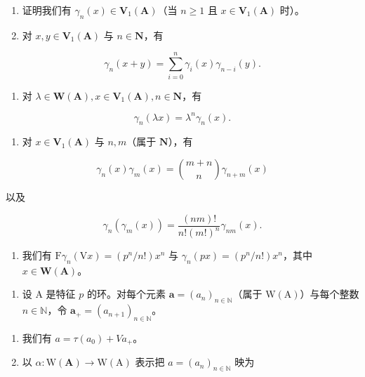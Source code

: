 \begin{enumerate}
\def\labelenumi{(\roman{enumi})}
\item
  证明我们有 \(\gamma_{n}(x)\in\mathbf{V}_{1}(\mathbf{A})\)（当 \(n\geqslant 1\) 且 \(x\in\mathbf{V}_{1}(\mathbf{A})\) 时）。
\item
  对 \(x, y \in \mathbf{V}_1(\mathbf{A})\) 与 \(n \in \mathbf{N}\)，有
\end{enumerate}

\[
\gamma_ {n} (x + y) = \sum_ {i = 0} ^ {n} \gamma_ {i} (x) \gamma_ {n - i} (y).
\]

\begin{enumerate}
\def\labelenumi{(\roman{enumi})}
\setcounter{enumi}{2}
\tightlist
\item
  对 \(\lambda \in \mathbf{W}(\mathbf{A}), x \in \mathbf{V}_1(\mathbf{A}), n \in \mathbf{N}\)，有
\end{enumerate}

\[
\gamma_ {n} (\lambda x) = \lambda^ {n} \gamma_ {n} (x).
\]

\begin{enumerate}
\def\labelenumi{(\roman{enumi})}
\setcounter{enumi}{3}
\tightlist
\item
  对 \(x \in \mathbf{V}_1(\mathbf{A})\) 与 \(n, m\)（属于 \(\mathbf{N}\)），有
\end{enumerate}

\[
\gamma_ {n} (x) \gamma_ {m} (x) = \binom {m + n} {n} \gamma_ {n + m} (x)
\]

以及

\[
\gamma_ {n} (\gamma_ {m} (x)) = \frac {(n m) !}{n ! (m !) ^ {n}} \gamma_ {n m} (x).
\]

\begin{enumerate}
\def\labelenumi{(\alph{enumi})}
\setcounter{enumi}{21}
\tightlist
\item
  我们有 \(\mathrm{F}\gamma_{n}(\mathrm{V}x) = (p^{n}/n!)x^{n}\) 与 \(\gamma_{n}(px) = (p^{n}/n!)x^{n}\)，其中 \(x \in \mathbf{W}(\mathbf{A})\)。
\end{enumerate}

\begin{enumerate}
\def\labelenumi{\arabic{enumi})}
\setcounter{enumi}{11}
\tightlist
\item
  设 A 是特征 \(p\) 的环。对每个元素 \(\boldsymbol{a} = (a_n)_{n \in \mathbb{N}}\)（属于 \(\mathrm{W(A)}\)）与每个整数 \(n \in \mathbb{N}\)，令 \(\boldsymbol{a}_+ = (a_{n+1})_{n \in \mathbb{N}}\)。
\end{enumerate}

\begin{enumerate}
\def\labelenumi{\alph{enumi})}
\item
  我们有 \(a = \tau(a_{0}) + V a_{+}\)。
\item
  以 \(\alpha : \mathrm{W}(\mathbf{A}) \to \mathrm{W}(\mathrm{A})\) 表示把 \(a = (a_n)_{n \in \mathbb{N}}\) 映为
\end{enumerate}

